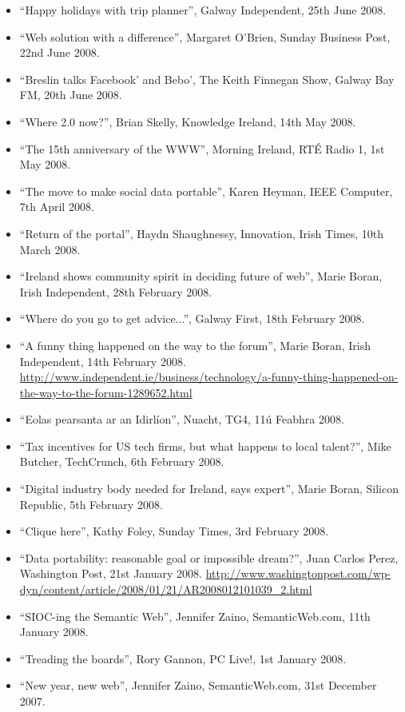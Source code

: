 \documentclass[10pt,a4paper]{res} %
\begin{document}
\begin{resume}
{\begin{itemize}
\item ``Happy holidays with trip planner'', Galway Independent, 25th June 2008.
\item ``Web solution with a difference'', Margaret O'Brien, Sunday Business Post, 22nd June 2008.
\item ``Breslin talks Facebook' and Bebo', The Keith Finnegan Show, Galway Bay FM, 20th June 2008.
\item ``Where 2.0 now?'', Brian Skelly, Knowledge Ireland, 14th May 2008.
\item ``The 15th anniversary of the WWW'', Morning Ireland, RT\'{E} Radio 1, 1st May 2008.
\item ``The move to make social data portable'', Karen Heyman, IEEE Computer, 7th April 2008.
\item ``Return of the portal'', Haydn Shaughnessy, Innovation, Irish Times, 10th March 2008.
\item ``Ireland shows community spirit in deciding future of web'', Marie Boran, Irish Independent, 28th February 2008.
\item ``Where do you go to get advice...'', Galway First, 18th February 2008.
\item ``A funny thing happened on the way to the forum'', Marie Boran, Irish Independent, 14th February 2008. \url{http://www.independent.ie/business/technology/a-funny-thing-happened-on-the-way-to-the-forum-1289652.html}
\item ``Eolas pearsanta ar an Idirl\'{i}on'', Nuacht, TG4, 11\'{u} Feabhra 2008.
\item ``Tax incentives for US tech firms, but what happens to local talent?'', Mike Butcher, TechCrunch, 6th February 2008.
\item ``Digital industry body needed for Ireland, says expert'', Marie Boran, Silicon Republic, 5th February 2008.
\item ``Clique here'', Kathy Foley, Sunday Times, 3rd February 2008.
\item ``Data portability: reasonable goal or impossible dream?'', Juan Carlos Perez, Washington Post, 21st January 2008. \url{http://www.washingtonpost.com/wp-dyn/content/article/2008/01/21/AR2008012101039_2.html}
\item ``SIOC-ing the Semantic Web'', Jennifer Zaino, SemanticWeb.com, 11th January 2008.
\item ``Treading the boards'', Rory Gannon, PC Live!, 1st January 2008.
\item ``New year, new web'', Jennifer Zaino, SemanticWeb.com, 31st December 2007.

\end{itemize}}
\end{resume}
\end{document}

